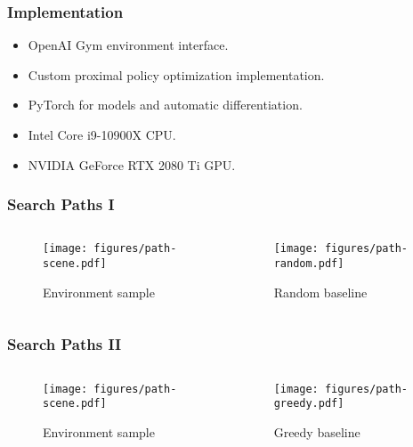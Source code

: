 \begin{frame}[noframenumbering]
    \frametitle{Implementation}

    \begin{itemize}
        \item OpenAI Gym environment interface.
        \item Custom proximal policy optimization implementation.
        \item PyTorch for models and automatic differentiation.
        \item Intel Core i9-10900X CPU.
        \item NVIDIA GeForce RTX 2080 Ti GPU.
    \end{itemize}
\end{frame}

\begin{frame}[noframenumbering]
    \frametitle{Search Paths I}

    \begin{columns}
        \begin{column}{0.5\textwidth}
            \begin{figure}
                \centering
                \texttt{[image: figures/path-scene.pdf]}
                \par Environment sample
            \end{figure}
        \end{column}
        \begin{column}{0.5\textwidth}
            \begin{figure}
                \centering
                \texttt{[image: figures/path-random.pdf]}
                \par Random baseline
            \end{figure}
        \end{column}
    \end{columns}
\end{frame}

\begin{frame}[noframenumbering]
    \frametitle{Search Paths II}

    \begin{columns}
        \begin{column}{0.5\textwidth}
            \begin{figure}
                \centering
                \texttt{[image: figures/path-scene.pdf]}
                \par Environment sample
            \end{figure}
        \end{column}
        \begin{column}{0.5\textwidth}
            \begin{figure}
                \centering
                \texttt{[image: figures/path-greedy.pdf]}
                \par Greedy baseline
            \end{figure}
        \end{column}
    \end{columns}
\end{frame}


